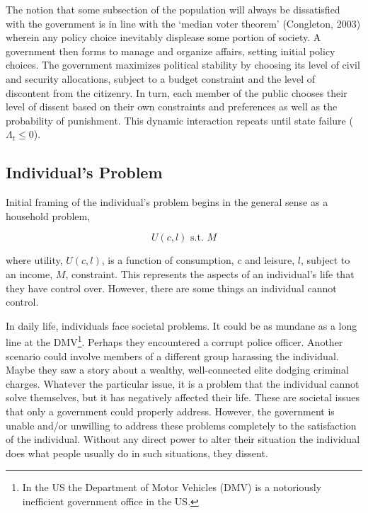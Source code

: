 \documentclass[12pt]{article}
\begin{document}
\begin{spacing}{1.5}
The notion that some subsection of the population will always be dissatisfied with the government is in line with the `median voter theorem' (Congleton, 2003) wherein any policy choice inevitably displease some portion of society. A government then forms to manage and organize affairs, setting initial policy choices. The government maximizes political stability by choosing its level of civil and security allocations, subject to a budget constraint and the level of discontent from the citizenry. In turn, each member of the public chooses their level of dissent based on their own constraints and preferences as well as the probability of punishment. This dynamic interaction repeats until state failure ($\Lambda_t\leq 0$). 

 
\subsection{Individual's Problem}

Initial framing of the individual's problem begins in the general sense as a household problem, 

\begin{equation}
	U(c,l) \text{ s.t. } M %
\end{equation}

\noindent where utility, $U(c,l)$, is a function of consumption, $c$ and leisure, $l$, subject to an income, $M$,  constraint. This represents the aspects of an individual's life that they have control over. However, there are some things an individual cannot control.  

In daily life, individuals face societal problems. It could be as mundane as a long line at the DMV\footnote{In the US the Department of Motor Vehicles (DMV) is a notoriously inefficient government office in the US.}. Perhaps they encountered a corrupt police officer. Another scenario could involve members of a different group harassing the individual. Maybe they saw a story about a wealthy, well-connected elite dodging criminal charges. Whatever the particular issue, it is a problem that the individual cannot solve themselves, but it has negatively affected their life. These are societal issues that only a government could properly address. However, the government is unable and/or unwilling to address these problems completely to the satisfaction of the individual. Without any direct power to alter their situation the individual does what people usually do in such situations, they dissent. 


\end{spacing}
\end{document}
